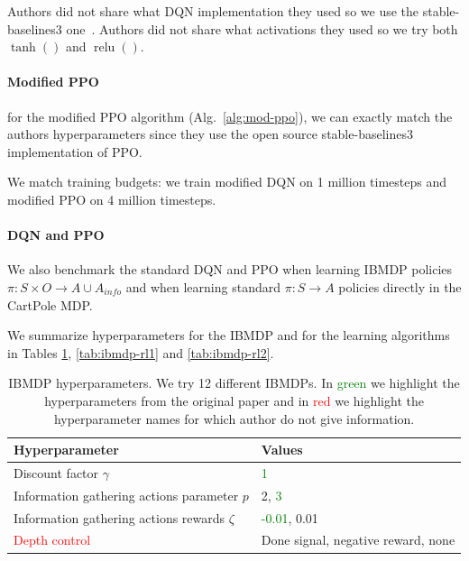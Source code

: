 Authors did not share what DQN implementation they used so we use the stable-baselines3 one~\cite{stable-baselines3}.
Authors did not share what activations they used so we try both $\operatorname{tanh}()$ and $\operatorname{relu}()$. 

\paragraph{Modified PPO} for the modified PPO algorithm (Alg.~\ref{alg:mod-ppo}), we can exactly match the authors hyperparameters since they use the open source stable-baselines3 implementation of PPO.

We match training budgets: we train modified DQN on 1 million timesteps and modified PPO on 4 million timesteps.

\paragraph{DQN and PPO} We also benchmark the standard DQN and PPO when learning IBMDP policies $\pi:S\times O\rightarrow A\cup A_{info}$ and when learning standard $\pi:S\rightarrow A$ policies directly in the CartPole MDP.

We summarize hyperparameters for the IBMDP and for the learning algorithms in Tables \ref{tab:ibmdp-params}, \ref{tab:ibmdp-rl1} and \ref{tab:ibmdp-rl2}.

\begin{table}[h]
    \centering
    \caption{IBMDP hyperparameters. We try 12 different IBMDPs. In \textcolor{green}{green} we highlight the hyperparameters from the original paper and in \textcolor{red}{red} we highlight the hyperparameter names for which author do not give information.}\label{tab:ibmdp-params}
    \begin{tabular}{ll}
    \toprule
    \textbf{Hyperparameter} & \textbf{Values}\\
    \midrule
    Discount factor $\gamma$ & \textcolor{green}{1} \\
    Information gathering actions parameter $p$ & 2, \textcolor{green}{3} \\
    Information gathering actions rewards $\zeta$ & \textcolor{green}{-0.01}, 0.01 \\
    \textcolor{red}{Depth control} & Done signal, negative reward, none \\ 
    \bottomrule
    \end{tabular}
    \end{table}

